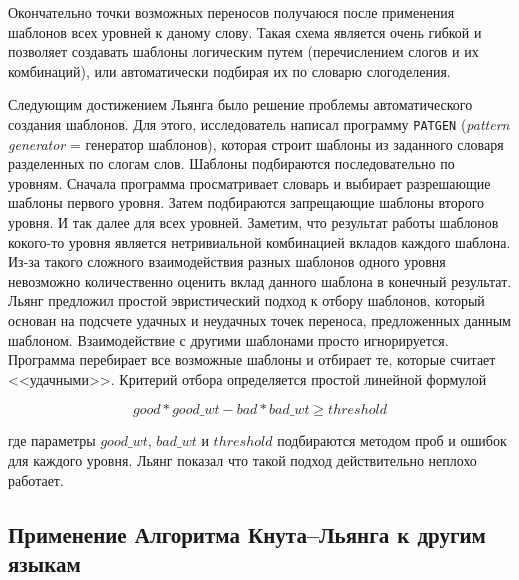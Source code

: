 \documentclass[12pt,a4paper,oneside]{extarticle}
\begin{document}
Окончательно точки возможных переносов получаюся после применения шаблонов всех уровней к даному слову. Такая схема является
очень гибкой и позволяет создавать шаблоны логическим путем (перечислением слогов и их комбинаций), или автоматически подбирая их
по словарю слогоделения.

Следующим достижением Льянга было решение проблемы автоматического создания шаблонов. Для этого, исследователь написал программу \verb+PATGEN+ (\emph{pattern generator} = генератор шаблонов), которая строит шаблоны из заданного словаря разделенных по слогам слов. Шаблоны подбираются последовательно по уровням. Сначала программа просматривает словарь и выбирает разрешающие шаблоны первого уровня.
Затем подбираются запрещающие шаблоны второго уровня. И так далее для всех уровней. Заметим, что результат работы шаблонов кокого-то уровня
является нетривиальной комбинацией вкладов каждого шаблона. Из-за такого сложного взаимодействия разных шаблонов одного уровня невозможно
количественно оценить вклад данного шаблона в конечный результат. Льянг предложил простой эвристический подход к отбору шаблонов,
который основан на подсчете удачных и неудачных точек переноса, предложенных данным шаблоном. Взаимодействие с другими шаблонами просто
игнорируется. Программа перебирает все возможные шаблоны и отбирает те, которые считает <<удачными>>. Критерий отбора определяется простой линейной формулой

\begin{equation}
\label{eff_formula}
good * good\_wt - bad * bad\_wt \geq threshold
\end{equation}

\noindent где параметры $good\_wt$, $bad\_wt$ и $threshold$ подбираются методом проб и ошибок для каждого уровня.
Льянг показал что такой подход действительно неплохо работает\autocite[Ср.: <<We do not have any theoretical justification for these parameters; they just seem to work well>>.][p.~36]{liang1983}.

\subsection{Применение Алгоритма Кнута--Льянга к другим языкам}
\end{document}
